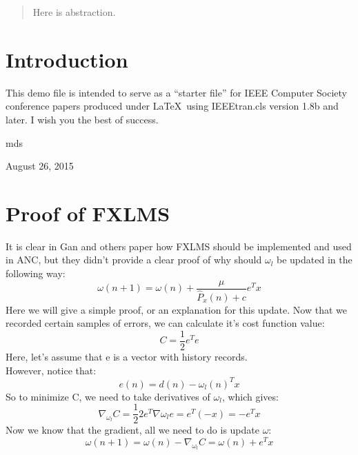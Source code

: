 \documentclass[conference,compsoc]{IEEEtran}
\begin{document}




\maketitle

\begin{abstract}
Here is abstraction.
\end{abstract}





%
\IEEEpeerreviewmaketitle



\section{Introduction}
This demo file is intended to serve as a ``starter file''
for IEEE Computer Society conference papers produced under \LaTeX\ using
IEEEtran.cls version 1.8b and later.
I wish you the best of success.

\hfill mds
 
\hfill August 26, 2015

\section{Proof of FXLMS}

	It is clear in Gan and others paper\cite{Gan2005Adaptive,Song2005Robust} how FXLMS should be implemented and used in ANC, but they didn't provide a clear proof of why should $\omega_l$ be updated in the following way:
	$$\omega(n+1) = \omega(n) + \frac{\mu}{\widehat P_x(n)+c}e^Tx$$
	Here we will give a simple proof, or an explanation for this update.
	Now that we recorded certain samples of errors, we can calculate it's cost function value:
	$$ C =\frac{1}{2} e^Te $$
	Here, let's assume that e is a vector with history records. \\
	However, notice that:
	$$ e(n) = d(n) - \omega_l(n)^T x$$
	So to minimize C, we need to take derivatives of $\omega_l$, which gives:
	$$ \nabla_{\omega_l} C = \frac{1}{2}2e^T\nabla{\omega_l} e = e^T(-x) = -e^Tx $$
	Now we know that the gradient, all we need to do is update $\omega$:
	$$ \omega(n+1) = \omega(n) - \nabla_{\omega_l} C = \omega(n) + e^Tx $$
	
\end{document}
